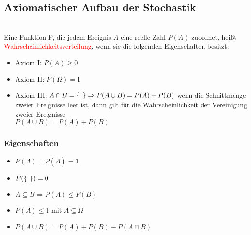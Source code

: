 \documentclass[a4paper,twocolumn,10pt]{onepgnote1}
\begin{document}
\subsection{Axiomatischer Aufbau der Stochastik}\\
Eine Funktion P, die jedem Ereignis $A$ eine reelle Zahl $P(A)$ zuordnet, heißt \textcolor{red}{Wahrscheinlichkeitsverteilung}, wenn sie die folgenden Eigenschaften besitzt: 
\begin{itemize}
    \item Axiom I: $P(A) \geq 0$
    \item Axiom II: $P(\Omega) = 1$ 
    \item Axiom III: $A\cap B = \{ \hspace{0.15cm} \} \Rightarrow P(A\cup B) = P(A) + P(B)$  wenn die Schnittmenge zweier Ereignisse leer ist, dann gilt für die Wahrscheinlichkeit der Vereinigung zweier Ereignisse \\$P(A\cup B) = P(A) + P(B)$ 
\end{itemize}
\subsubsection{Eigenschaften}
\begin{itemize}
    \item $P(A) + P(\bar{A}) = 1$
    \item $P(\{ \hspace{0.15cm} \}) = 0 $
    \item $A\subseteq B \Rightarrow  P(A) \leq P(B)$
    \item $P(A) \leq 1$ mit $A\subseteq \Omega$
    \item $P(A \cup B) = P(A) + P(B) - P(A\cap B)$
\end{itemize}
\end{document}
